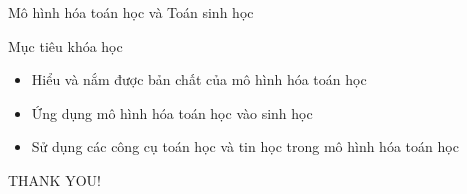 \documentclass[pdf,aspectratio=169]{beamer}
\begin{document}
\begin{frame}{Mô hình hóa toán học và Toán sinh học}
\begin{center}
    \end{center}

\end{frame}

\begin{frame}{Mục tiêu khóa học}
    \begin{itemize}
        \item Hiểu và nắm được bản chất của mô hình hóa toán học
        \item Ứng dụng mô hình hóa toán học vào sinh học
        \item Sử dụng các công cụ toán học và tin học trong mô hình hóa toán học
    \end{itemize}
\end{frame}

%    


\begin{frame}[plain]
    \begin{center}
        \vspace{1cm}
        \Huge THANK YOU!
    \end{center}
\end{frame}
\end{document}

